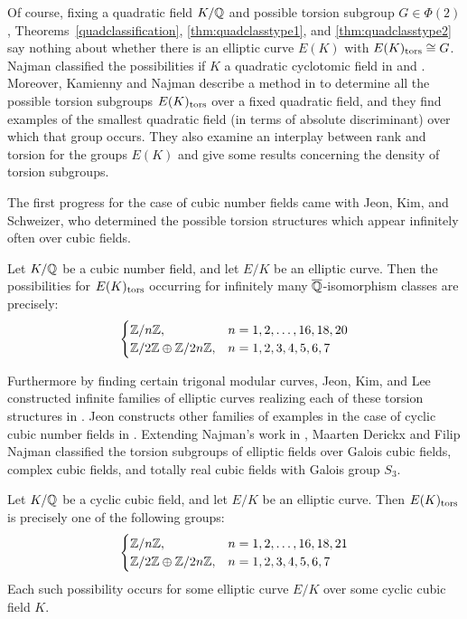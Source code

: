 Of course, fixing a quadratic field $K/\mathbb{Q}$ and possible torsion subgroup $G \in \Phi(2)$, Theorems~\ref{quadclassification}, \ref{thm:quadclasstype1}, and \ref{thm:quadclasstype2} say nothing about whether there is an elliptic curve $E(K)$ with $E(K)_{\text{tors}} \cong G$. Najman classified the possibilities if $K$ a quadratic cyclotomic field in \cite{najman11cyclo} and \cite{najman10}. Moreover, Kamienny and Najman describe a method in \cite{kamiennynajman11} to determine all the possible torsion subgroups $E(K)_{\text{tors}}$ over a fixed quadratic field, and they find examples of the smallest quadratic field (in terms of absolute discriminant) over which that group occurs. They also examine an interplay between rank and torsion for the groups $E(K)$ and give some results concerning the density of torsion subgroups. 


The first progress for the case of cubic number fields came with Jeon, Kim, and Schweizer, who determined the possible torsion structures which appear infinitely often over cubic fields.


\begin{thm} \label{thm:infinitecubictorsion}
Let $K/\mathbb{Q}$ be a cubic number field, and let $E/K$ be an elliptic curve. Then the possibilities for $E(K)_{\text{tors}}$ occurring for infinitely many $\overline{\mathbb{Q}}$-isomorphism classes are precisely:
	\[
	\begin{cases}
	\mathbb{Z}/n\mathbb{Z}, & n= 1, 2, \ldots, 16, 18, 20 \\
	\mathbb{Z}/2\mathbb{Z} \oplus \mathbb{Z}/2n\mathbb{Z}, & n= 1, 2, 3, 4, 5, 6, 7
	\end{cases} 
	\]
\end{thm}


Furthermore by finding certain trigonal modular curves, Jeon, Kim, and Lee constructed infinite families of elliptic curves realizing each of these torsion structures in \cite{jeonkimlee11}. Jeon constructs other families of examples in the case of cyclic cubic number fields in \cite{jeon16}. Extending Najman's work in \cite{najman11}, Maarten Derickx and Filip Najman classified the torsion subgroups of elliptic fields over Galois cubic fields, complex cubic fields, and totally real cubic fields with Galois group $S_3$. 


\begin{thm}
Let $K/\mathbb{Q}$ be a cyclic cubic field, and let $E/K$ be an elliptic curve. Then $E(K)_{\text{tors}}$ is precisely one of the following groups:
	\[
	\begin{cases}
	\mathbb{Z}/n\mathbb{Z}, & n= 1, 2, \ldots, 16, 18, 21 \\
	\mathbb{Z}/2\mathbb{Z} \oplus \mathbb{Z}/2n\mathbb{Z}, & n= 1, 2, 3, 4, 5, 6, 7
	\end{cases}
	\]
Each such possibility occurs for some elliptic curve $E/K$ over some cyclic cubic field $K$.
\end{thm}


